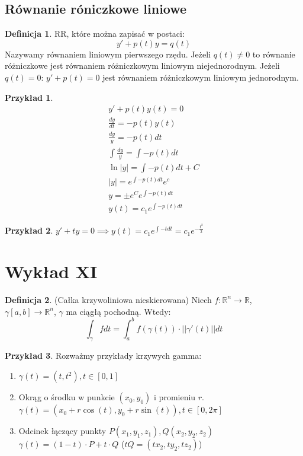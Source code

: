 \documentclass{article}
\theoremstyle{definition}
\newtheorem{de}{Definicja}[subsection]
\theoremstyle{definition}
\theoremstyle{definition}
\newtheorem{pk}{Przykład}[subsection]
\theoremstyle{definition}
\begin{document}
\subsection{Równanie róniczkowe liniowe}

\begin{de}
    RR, które można zapisać w postaci:
    \[y' + p(t)y = q(t)\]
    Nazywamy równaniem liniowym pierwszego rzędu.
    Jeżeli $q(t)\neq 0$ to równanie różniczkowe jest równaniem różniczkowym liniowym niejednorodnym.
    Jeżeli $q(t)=0$: $y'+p(t)=0$ jest równaniem różniczkowym liniowym jednorodnym.
\end{de}

\begin{pk}
    \begin{align}
        y' + p(t)y(t) = 0\\
        \frac{dy}{dt} = -p(t)y(t)\\
        \frac{dy}{y} = -p(t)dt\\
        \int \frac{dy}{y} = \int -p(t) dt\\
        \ln|y| = \int -p(t) dt + C\\
        |y| = e^{\int -p(t) dt} e^{c}\\
        y=\pm e^C e^{\int -p(t) dt}\\
        y(t) = c_1 e^{\int -p(t) dt} 
    \end{align}
\end{pk}

\begin{pk}
    $y' + ty = 0 \implies y(t) = c_1 e^{\int -t dt} = c_1 e^{-\frac{t^2}{2}}$
\end{pk}

\section{Wykład XI}

\begin{de}
    (Całka krzywoliniowa nieskierowana) Niech \( f:\mathbb{R}^n \rightarrow \mathbb{R} \), \( \gamma [a,b]\rightarrow\mathbb{R}^n\), $\gamma$ ma ciągłą pochodną.
    Wtedy:
    \[ \int_{\gamma} f dt = \int_{a}^{b} f(\gamma(t)) \cdot ||\gamma'(t)|| dt \]
\end{de}

\begin{pk}
    Rozważmy przykłady krzywych gamma:
    \begin{enumerate}
        \item \( \gamma (t) = (t,t^2), t\in[0,1] \)
        \item Okrąg o środku w punkcie $(x_0,y_0)$ i promieniu $r$. \( \gamma(t) = (x_0 + r\cos(t), y_0 + r\sin(t)), t \in [0,2\pi]\)
        \item Odcinek łączący punkty $P(x_1,y_1,z_1), Q(x_2,y_2,z_2)$ \( \gamma(t) = (1-t)\cdot P + t\cdot Q\) ($tQ = (tx_2, ty_2, tz_2)$)
    \end{enumerate}
\end{pk}
\end{document}
